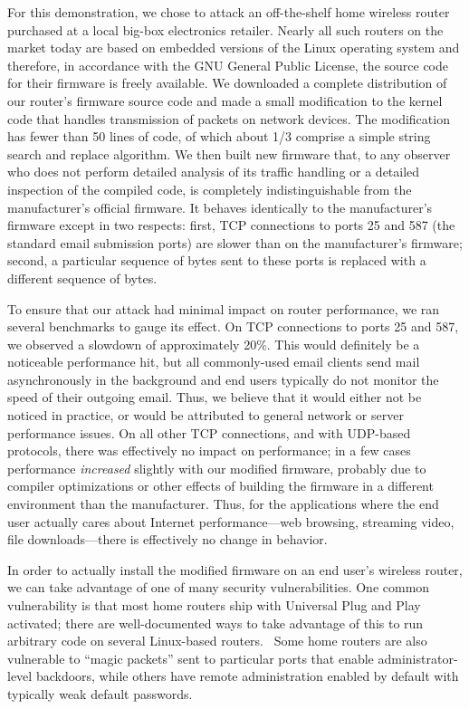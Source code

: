 \documentclass{article}
\begin{document}
For this demonstration, we chose to attack an off-the-shelf home
wireless router purchased at a local big-box electronics
retailer. Nearly all such routers on the market today are based on
embedded versions of the Linux operating system and therefore, in
accordance with the GNU General Public License, the source code for
their firmware is freely available. We downloaded a complete
distribution of our router's firmware source code and made a small
modification to the kernel code that handles transmission of packets
on network devices. The modification has fewer than 50 lines of code,
of which about 1/3 comprise a simple string search and replace
algorithm. We then built new firmware that, to any observer who does
not perform detailed analysis of its traffic handling or a detailed
inspection of the compiled code, is completely indistinguishable from
the manufacturer's official firmware. It behaves identically to the
manufacturer's firmware except in two respects: first, TCP connections
to ports 25 and 587 (the standard email submission ports) are slower
than on the manufacturer's firmware; second, a particular sequence of
bytes sent to these ports is replaced with a different sequence of
bytes.

To ensure that our attack had minimal impact on router performance, we
ran several benchmarks to gauge its effect. On TCP connections to
ports 25 and 587, we observed a slowdown of approximately 20\%. This
would definitely be a noticeable performance hit, but all
commonly-used email clients send mail asynchronously in the background
and end users typically do not monitor the speed of their outgoing
email. Thus, we believe that it would either not be noticed in
practice, or would be attributed to general network or server
performance issues. On all other TCP connections, and with UDP-based
protocols, there was effectively no impact on performance; in a few
cases performance \emph{increased} slightly with our modified
firmware, probably due to compiler optimizations or other effects of
building the firmware in a different environment than the
manufacturer. Thus, for the applications where the end user actually
cares about Internet performance---web browsing, streaming video, file
downloads---there is effectively no change in behavior.

In order to actually install the modified firmware on an end user's
wireless router, we can take advantage of one of many security
vulnerabilities. One common vulnerability is that most home routers
ship with Universal Plug and Play activated; there are well-documented
ways to take advantage of this to run arbitrary code on several
Linux-based routers.~\cite{UPnP} Some home routers are also vulnerable
to ``magic packets'' sent to particular ports that enable
administrator-level backdoors, while others have remote administration
enabled by default with typically weak default passwords.
\end{document}
